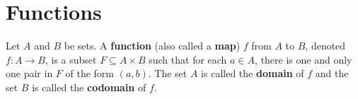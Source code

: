 \chapter{Functions}
\begin{definition}\cite{bloch_proofs_2011}
	\label{definition-function}
	Let $A$ and $B$ be sets. A \textbf{function} (also called a \textbf{map}) $f$ from $A$ to $B$, denoted $f : A \to B$, is a subset $F \subseteq A \times B$ such that for each $a \in A$, there is one and only one pair in $F$ of the form $\left( a, b \right)$. The set $A$ is called the \textbf{domain} of $f$ and the set $B$ is called the \textbf{codomain} of $f$.
\end{definition}
